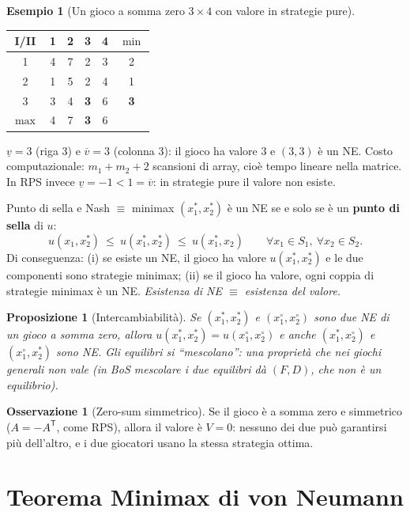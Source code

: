 \documentclass[12pt,a4paper,twoside]{book}
\theoremstyle{plain}
\newtheorem{proposition}[theorem]{Proposizione}
\theoremstyle{definition}
\newtheorem{example}[theorem]{Esempio}
\newtheorem{remark}[theorem]{Osservazione}
\begin{document}
\begin{example}[Un gioco a somma zero $3\times 4$ con valore in strategie pure]
\begin{center}
\begin{tabular}{c|cccc|c}
I/II & 1 & 2 & 3 & 4 & $\min$ \\\hline
1 & 4 & 7 & 2 & 3 & 2 \\
2 & 1 & 5 & 2 & 4 & 1 \\
3 & 3 & 4 & \textbf{3} & 6 & \textbf{3} \\\hline
$\max$ & 4 & 7 & \textbf{3} & 6 &
\end{tabular}
\end{center}
$\underline{v}=3$ (riga 3) e $\overline{v}=3$ (colonna 3): il gioco ha valore $3$ e
$(3,3)$ è un NE. Costo computazionale: $m_1+m_2+2$ scansioni di array, cioè
tempo lineare nella matrice. In RPS invece $\underline{v}=-1<1=\overline{v}$: in
strategie pure il valore non esiste.
\end{example}

\begin{thmbox}{Punto di sella e Nash $\equiv$ minimax}
$(x_1^*,x_2^*)$ è un NE se e solo se è un \textbf{punto di sella} di $u$:
\[
  u(x_1,x_2^*)\ \le\ u(x_1^*,x_2^*)\ \le\ u(x_1^*,x_2)
  \qquad\forall x_1\in S_1,\ \forall x_2\in S_2.
\]
Di conseguenza: (i) se esiste un NE, il gioco ha valore $u(x_1^*,x_2^*)$ e le due
componenti sono strategie minimax; (ii) se il gioco ha valore, ogni coppia di
strategie minimax è un NE. \emph{Esistenza di NE $\equiv$ esistenza del valore.}
\end{thmbox}

\begin{proposition}[Intercambiabilità]
Se $(x_1^*,x_2^*)$ e $(x_1^\circ,x_2^\circ)$ sono due NE di un gioco a somma zero,
allora $u(x_1^*,x_2^*)=u(x_1^\circ,x_2^\circ)$ e anche $(x_1^*,x_2^\circ)$ e
$(x_1^\circ,x_2^*)$ sono NE. Gli equilibri si ``mescolano'': una proprietà che
nei giochi generali non vale (in BoS mescolare i due equilibri dà $(F,D)$, che non
è un equilibrio).
\end{proposition}

\begin{remark}[Zero-sum simmetrico]
Se il gioco è a somma zero e simmetrico ($A=-A^{\mathsf T}$, come RPS), allora il
valore è $V=0$: nessuno dei due può garantirsi più dell'altro, e i due giocatori
usano la stessa strategia ottima.
\end{remark}

\section{Teorema Minimax di von Neumann}
\end{document}
